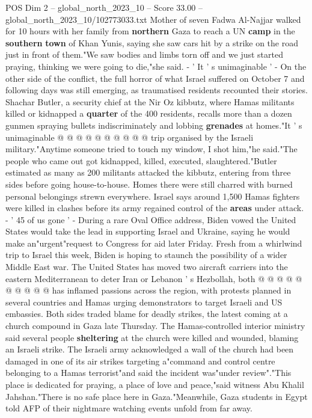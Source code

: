 \begin{textsample}{POS Dim 2 – global\_north\_2023\_10 – Score 33.00 – global\_north\_2023\_10/102773033.txt}
Mother of seven Fadwa Al-Najjar walked for 10 hours with her family from \textbf{northern} Gaza to reach a UN \textbf{camp} in the \textbf{southern} \textbf{town} of Khan Yunis, saying she saw cars hit by a strike on the road just in front of them."We saw bodies and limbs torn off and we just started praying, thinking we were going to die,"she said. - ' It ' s unimaginable ' - On the other side of the conflict, the full horror of what Israel suffered on October 7 and following days was still emerging, as traumatised residents recounted their stories.
Shachar Butler, a security chief at the Nir Oz kibbutz, where Hamas militants killed or kidnapped a \textbf{quarter} of the 400 residents, recalls more than a dozen gunmen spraying bullets indiscriminately and lobbing \textbf{grenades} at homes."It ' s unimaginable @ @ @ @ @ @ @ @ @ @ trip organised by the Israeli military."Anytime someone tried to touch my window, I shot him,"he said."The people who came out got kidnapped, killed, executed, slaughtered."Butler estimated as many as 200 militants attacked the kibbutz, entering from three sides before going house-to-house.
Homes there were still charred with burned personal belongings strewn everywhere.
Israel says around 1,500 Hamas fighters were killed in clashes before its army regained control of the \textbf{areas} under attack. - ' 45 of us gone ' - During a rare Oval Office address, Biden vowed the United States would take the lead in supporting Israel and Ukraine, saying he would make an"urgent"request to Congress for aid later Friday.
Fresh from a whirlwind trip to Israel this week, Biden is hoping to staunch the possibility of a wider Middle East war.
The United States has moved two aircraft carriers into the eastern Mediterranean to deter Iran or Lebanon ' s Hezbollah, both @ @ @ @ @ @ @ @ @ @ has inflamed passions across the region, with protests planned in several countries and Hamas urging demonstrators to target Israeli and US embassies.
Both sides traded blame for deadly strikes, the latest coming at a church compound in Gaza late Thursday.
The Hamas-controlled interior ministry said several people \textbf{sheltering} at the church were killed and wounded, blaming an Israeli strike.
The Israeli army acknowledged a wall of the church had been damaged in one of its air strikes targeting a"command and control centre belonging to a Hamas terrorist"and said the incident was"under review"."This place is dedicated for praying, a place of love and peace,"said witness Abu Khalil Jahshan."There is no safe place here in Gaza."Meanwhile, Gaza students in Egypt told AFP of their nightmare watching events unfold from far away.

\end{textsample}
